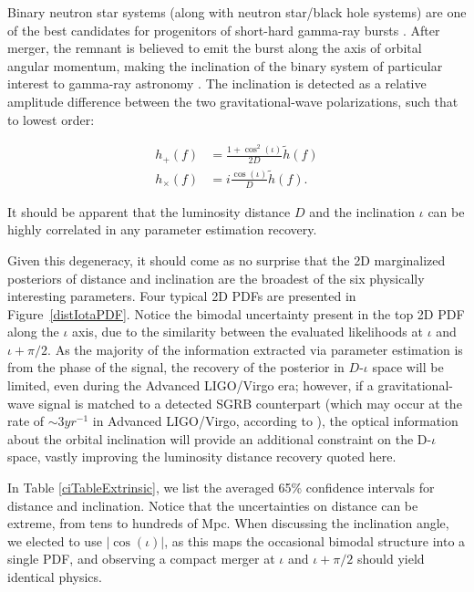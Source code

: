 \documentclass[11pt,a4paper]{emulateapj} 
\newcommand{\carl}[1]{{\color{red} #1}}
\begin{document}
Binary neutron star systems (along with neutron star/black hole
systems) are one of the best candidates for progenitors of short-hard
gamma-ray bursts \citep[and references therein]{Nakar2007}.  After
merger, the remnant is believed to emit the burst along the axis of
orbital angular momentum, making the inclination of the binary system
of particular interest to gamma-ray astronomy
\citep{LSCGRB2010,Corsi2012}.  The inclination is detected as a
relative amplitude difference between the two gravitational-wave
polarizations, such that to lowest order:

\begin{align}
h_+(f) &= \frac{1+\cos^2(\iota)}{2 D} \tilde{h}(f) \nonumber
\\ h_\times(f) &= i \frac{\cos(\iota)}{D}\tilde{h}(f) .
\end{align}

\noindent It should be apparent that the luminosity distance $D$ and
the inclination $\iota$ can be highly correlated in any parameter
estimation recovery.

Given this degeneracy, it should come as no surprise that the 2D
marginalized posteriors of distance and inclination are the broadest
of the six physically interesting parameters.  Four typical 2D PDFs
are presented in Figure~\ref{distIotaPDF}.  Notice the bimodal
uncertainty present in the top 2D PDF along the $\iota$ axis, due to
the similarity between the evaluated likelihoods at $\iota$ and $\iota
+ \pi/2$.  As the majority of the information extracted via parameter
estimation is from the phase of the signal, the recovery of the
posterior in $D$-$\iota$ space will be limited, even during the
Advanced LIGO/Virgo era; however, if a gravitational-wave signal is
matched to a detected SGRB counterpart (which may occur at the rate of
$\sim 3 yr^{-1}$ in Advanced LIGO/Virgo, according to
\cite{Metzger2013}), the optical information about the orbital
inclination will provide an additional constraint on the D-$\iota$
space, vastly improving the luminosity distance recovery quoted here.
 
 
In Table \ref{ciTableExtrinsic}, we list the averaged 65\% confidence
intervals for distance and inclination.  Notice that the uncertainties
on distance can be extreme, from tens to hundreds of Mpc.  When
discussing the inclination angle, we elected to use $|\cos(\iota)|$,
as this maps the occasional bimodal structure into a single PDF, and
observing a compact merger at $\iota$ and $\iota + \pi/2$ should yield
identical physics.
\end{document}
